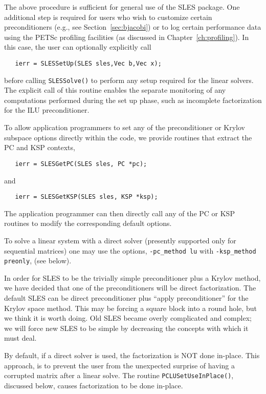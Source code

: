 The above procedure is sufficient for general use of the SLES package.
One additional step is required for users who wish to customize certain 
preconditioners (e.g., see Section~\ref{sec:bjacobi}) or to log certain 
performance data using the PETSc profiling facilities (as discussed in 
Chapter~\ref{ch:profiling}).
In this case, the user can optionally explicitly call 
\begin{verbatim}
   ierr = SLESSetUp(SLES sles,Vec b,Vec x);
\end{verbatim}
before calling {\tt SLESSolve()} to perform any setup required for 
the linear solvers.  The explicit call of this routine enables the
separate monitoring of any computations performed during the set up
phase, such as incomplete factorization for the ILU preconditioner.

To allow application programmers to set any of the preconditioner or 
Krylov subspace options directly within the code, we provide routines
that extract the PC and KSP contexts, 
\begin{verbatim}
   ierr = SLESGetPC(SLES sles, PC *pc);
\end{verbatim}
and 
\begin{verbatim}
   ierr = SLESGetKSP(SLES sles, KSP *ksp);
\end{verbatim}
The application programmer can then directly call any of the PC or KSP 
routines to modify the corresponding default options. 

To solve a linear system with a direct solver (presently supported 
only for sequential matrices) one may use the options, 
{\tt -pc\_method lu} with {\tt -ksp\_method preonly}, (see below).

\begin{design}
In order for SLES to be the trivially simple preconditioner plus
a Krylov method, we have decided that one of the preconditioners will be 
direct factorization. The default SLES can be direct preconditioner 
plus ``apply preconditioner'' for the  Krylov space method.
 This may be forcing
a square block into a round hole, but we think it is worth doing. 
Old SLES became overly complicated and complex; we will force new
SLES to be simple by decreasing the concepts with which it must deal.
\end{design}

\begin{design}
By default, if a direct solver is used, the factorization is NOT done 
in-place. This approach, is to prevent the user from the unexpected surprise
of having a corrupted matrix after a linear solve. The routine 
{\tt PCLUSetUseInPlace()}, discussed below, causes factorization to 
be done in-place.  
\end{design}


